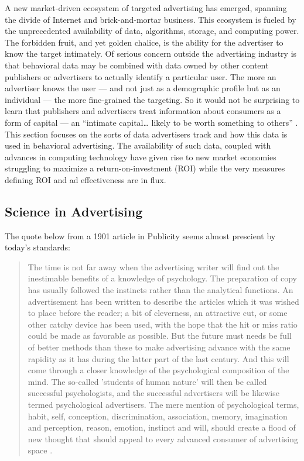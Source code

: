 A new market-driven ecosystem of targeted advertising has emerged, spanning the divide of Internet and brick-and-mortar business. This ecosystem is fueled by the unprecedented availability of data, algorithms, storage, and computing power. The forbidden fruit, and yet golden chalice, is the ability for the advertiser to know the target intimately. Of serious concern outside the advertising industry is that behavioral data may be combined with data owned by other content publishers or advertisers to actually identify a particular user. The more an advertiser knows the user --- and not just as a demographic profile but as an individual --- the more fine-grained the targeting. So it would not be surprising to learn that publishers and advertisers treat information about consumers as a form of capital --- an ``intimate capital{\ldots} likely to be worth something to others''  \citep[p. 127]{Locke:2010wt}.  This section focuses on the sorts of data advertisers track and how this data is used in behavioral advertising. The availability of such data, coupled with advances in computing technology have given rise to new market economies struggling to maximize a return-on-investment (ROI) while the very measures defining ROI and ad effectiveness are in flux.

\subsection{Science in Advertising}
\label{scienceinadvertising}

The quote below from a 1901 article in Publicity seems almost prescient by today's standards:


\begin{quote}
The time is not far away when the advertising writer will find out the inestimable benefits of a knowledge of psychology. The preparation of copy has usually followed the instincts rather than the analytical functions. An advertisement has been written to describe the articles which it was wished to place before the reader; a bit of cleverness, an attractive cut, or some other catchy device has been used, with the hope that the hit or miss ratio could be made as favorable as possible. But the future must needs be full of better methods than these to make advertising advance with the same rapidity as it has during the latter part of the last century. And this will come through a closer knowledge of the psychological composition of the mind. The so-called 'students of human nature' will then be called successful psychologists, and the successful advertisers will be likewise termed psychological advertisers. The mere mention of psychological terms, habit, self, conception, discrimination, association, memory, imagination and perception, reason, emotion, instinct and will, should create a flood of new thought that should appeal to every advanced consumer of advertising space \citep[as cited in][]{Scott:1904td}.
\end{quote}


